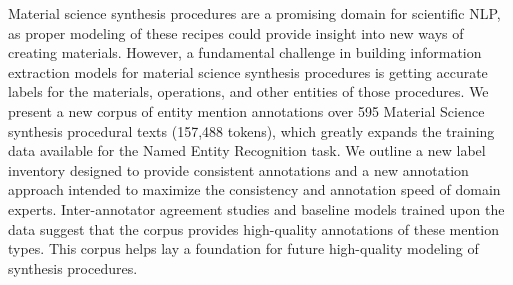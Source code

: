 Material science synthesis procedures are a promising domain for scientific NLP, as proper modeling of these recipes could provide insight into new ways of creating materials.  However, a fundamental challenge in building information extraction models for material science synthesis procedures is getting accurate labels for the materials, operations, and other entities of those procedures. We present a new corpus of entity mention annotations over 595 Material Science synthesis procedural texts (157,488 tokens), which greatly expands the training data available for the Named Entity Recognition task. We outline a new label inventory designed to provide consistent annotations and a new annotation approach intended to maximize the consistency and annotation speed of domain experts. Inter-annotator agreement studies and baseline models trained upon the data suggest that the corpus provides high-quality annotations of these mention types. This corpus helps lay a foundation for future high-quality modeling of synthesis procedures.
